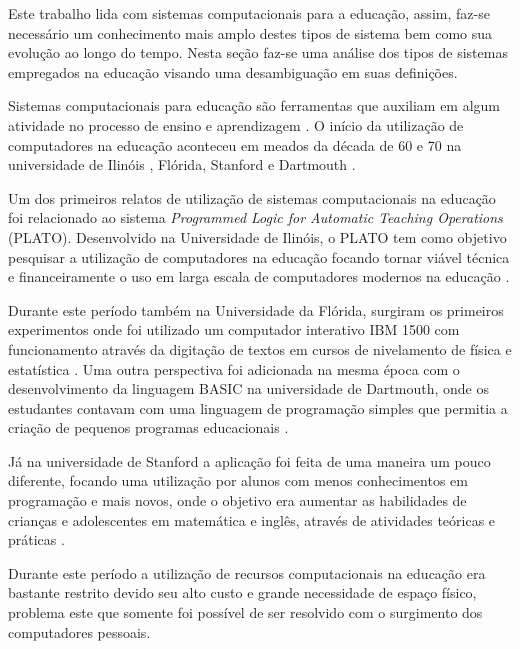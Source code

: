 
Este trabalho lida com sistemas computacionais para a educação, assim, faz-se necessário um conhecimento mais amplo destes tipos de sistema bem como sua evolução ao longo do tempo. Nesta seção faz-se uma análise dos tipos de sistemas empregados na educação visando uma desambiguação em suas definições.

Sistemas computacionais para educação são ferramentas que auxiliam em algum atividade no processo de ensino e aprendizagem \cite{tchounikine11}. O início da utilização de computadores na educação aconteceu em meados da década de 60 e 70 na universidade de Ilinóis \cite{plato}, Flórida, Stanford e Dartmouth \cite{chambers80}.

Um dos primeiros relatos de utilização de sistemas computacionais na educação foi relacionado ao sistema \emph{Programmed Logic for Automatic Teaching Operations} (PLATO). Desenvolvido na Universidade de Ilinóis, o PLATO tem como objetivo pesquisar a utilização de computadores na educação focando tornar viável técnica e financeiramente o uso em larga escala de computadores modernos na educação \cite{plato}.

Durante este período também na Universidade da Flórida, surgiram os primeiros experimentos onde foi utilizado um computador interativo IBM 1500 com funcionamento através da digitação de textos em cursos de nivelamento de física e estatística \cite{chambers80}. Uma outra perspectiva foi adicionada na mesma época com o desenvolvimento da linguagem BASIC na universidade de Dartmouth, onde os estudantes contavam com uma linguagem de programação simples que permitia a criação de pequenos programas educacionais \cite{chambers80}. 

Já na universidade de Stanford a aplicação foi feita de uma maneira um pouco diferente, focando uma utilização por alunos com menos conhecimentos em programação e mais novos, onde o objetivo era aumentar as habilidades de crianças e adolescentes em matemática e inglês, através de atividades teóricas e práticas \cite{chambers80}.

Durante este período a utilização de recursos computacionais na educação era bastante restrito devido seu alto custo e grande necessidade de espaço físico, problema este que somente foi possível de ser resolvido com o surgimento dos computadores pessoais. 

